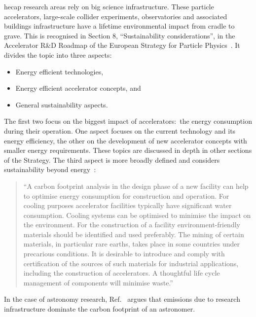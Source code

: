 \documentclass[../SustainableHEP.tex]{subfiles}
\begin{document}
\noindent \acrshort{hecap} research areas rely on big science infrastructure. These particle accelerators, large-scale collider experiments, observatories and associated buildings infrastructure have a lifetime environmental impact from cradle to grave. This is recognised in Section 8, ``Sustainability considerations'', in the Accelerator R\&D Roadmap of the European Strategy for Particle Physics~\cite{EuropStrategyPP}. It divides the topic into three aspects:
\begin{itemize}
    \item Energy efficient technologies,
    \item Energy efficient accelerator concepts, and
    \item General sustainability aspects.
\end{itemize}
The first two focus on the biggest impact of accelerators:\ the energy consumption during their operation. One aspect focuses on the current technology and its energy efficiency, the other on the development of new accelerator concepts with smaller energy requirements. These topics are discussed in depth in other sections of the Strategy. The third aspect is more broadly defined and considers sustainability beyond energy~\cite{EuropStrategyPP}:
\begin{quotation}
    ``A carbon footprint analysis in the design phase of a new facility can help to optimise energy consumption for construction and operation. For cooling purposes accelerator facilities typically have significant water consumption. Cooling systems can be optimised to minimise the impact on the environment. For the construction of a facility environment-friendly materials should be identified and used preferably. The mining of certain materials, in particular rare earths, takes place in some countries under precarious conditions. It is desirable to introduce and comply with certification of the sources of such materials for industrial applications, including the construction of accelerators. A thoughtful life cycle management of components will minimise waste.''
\end{quotation}

In the case of astronomy research, Ref.~\cite{Kn_dlseder_2022} argues that emissions due to research infrastructure dominate the carbon footprint of an astronomer.
\end{document}
